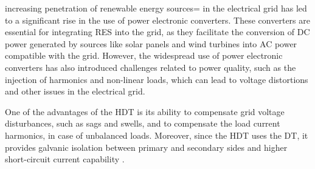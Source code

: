  increasing penetration of renewable energy sources= in the electrical grid has led to a significant rise in the use of power electronic converters. These converters are essential for integrating RES into the grid, as they facilitate the conversion of DC power generated by sources like solar panels and wind turbines into AC power compatible with the grid. However, the widespread use of power electronic converters has also introduced challenges related to power quality, such as the injection of harmonics and non-linear loads, which can lead to voltage distortions and other issues in the electrical grid.



One of the advantages of the HDT is its ability to compensate grid voltage disturbances, such as sags and swells, and to compensate the load current harmonics, in case of unbalanced loads. Moreover, since the HDT uses the DT, it provides galvanic isolation between primary and secondary sides and higher short-circuit current capability \cite{carrenoCirculatingActivePower2023}.